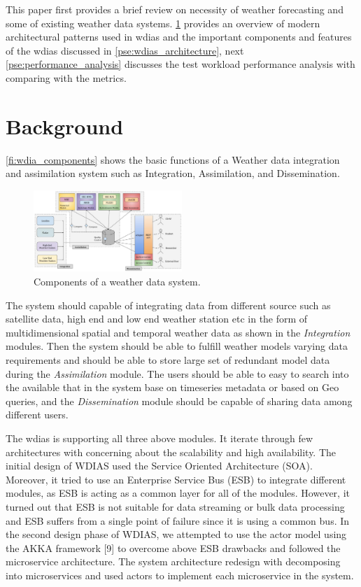 \documentclass[conference]{IEEEtran}
\newcommand{\db}[1]{\textcolor{blue!40}{#1}}
\begin{document}
This paper first provides a brief review on necessity of weather forecasting and some of existing weather data systems. \cref{pse:background} provides an overview of modern architectural patterns used in \acrshort{wdias} and the important components and features of the \acrshort{wdias} discussed in \cref{pse:wdias_architecture}, next \cref{pse:performance_analysis} discusses the test workload performance analysis with comparing with the metrics. 
\section{\db{Background}}
\label{pse:background}

\cref{fi:wdia_components} shows the basic functions of a Weather data integration and assimilation system such as Integration, Assimilation, and Dissemination.

\begin{figure}[htbp]
\centerline{\includegraphics[width=0.5\textwidth]{method/misc/weather_data_system_components.jpg}}
\caption{Components of a weather data system.}
\label{pfi:wdia_components}
\end{figure}

The system should capable of integrating data from different source such as satellite data, high end and low end weather station etc in the form of multidimensional spatial and temporal weather data as shown in the \emph{Integration} modules.
Then the system should be able to fulfill weather models varying data requirements and should be able to store large set of redundant model data during the \emph{Assimilation} module.
The users should be able to easy to search into the available that in the system base on timeseries metadata or based on Geo queries, and the \emph{Dissemination} module should be capable of sharing data among different users.

The \acrshort{wdias} is supporting all three above modules. It iterate through few architectures with concerning about the scalability and high availability.
The initial design of WDIAS used the Service Oriented Architecture (SOA). Moreover, it tried to use an Enterprise Service Bus (ESB) to integrate different modules, as ESB is acting as a common layer for all of the modules. However, it turned out that ESB is not suitable for data streaming or bulk data processing and ESB suffers from a single point of failure since it is using a common bus.
In the second design phase of WDIAS, we attempted to use the actor model using the AKKA framework [9] to overcome above ESB drawbacks and followed the microservice architecture. The system architecture redesign with decomposing into microservices and
used actors to implement each microservice in the system.
\end{document}
